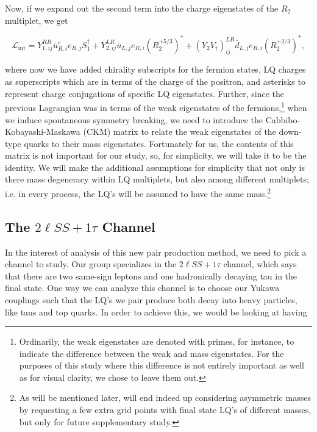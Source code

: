         Now, if we expand out the second term into the charge eigenstates of the $R_2$ multiplet, we get

        \begin{equation}
            \mathcal{L}_{\text{int}} = Y_{1,ij}^{RR} \bar{u}^c_{R,i} e_{R,j} S_1^{\dagger} + Y_{2,ij}^{LR} \bar{u}_{L,j} e_{R,i}  (R_2^{+5/3})^* + (Y_2 V_{\dagger})_{ij}^{LR}\bar{d}_{L,j} e_{R,i}  (R_2^{+2/3})^*,
        \end{equation}

        where now we have added chirality subscripts for the fermion states, LQ charges as superscripts which are in terms of the charge of the positron, and asterisks to represent charge conjugations of specific LQ eigenstates. Further, since the previous Lagrangian was in terms of the weak eigenstates of the fermions,\footnote{Ordinarily, the weak eigenstates are denoted with primes, for instance, to indicate the difference between the weak and mass eigenstates. For the purposes of this study where this difference is not entirely important as well as for visual clarity, we chose to leave them out.} when we induce spontaneous symmetry breaking, we need to introduce the Cabbibo-Kobayashi-Maskawa (CKM) matrix to relate the weak eigenstates of the down-type quarks to their mass eigenstates. Fortunately for us, the contents of this matrix is not important for our study, so, for simplicity, we will take it to be the identity. We will make the additional assumptions for simplicity that not only is there mass degeneracy within LQ multiplets, but also among different multiplets; i.e. in every process, the LQ's will be assumed to have the same mass.\footnote{As will be mentioned later, will end indeed up considering asymmetric masses by requesting a few extra grid points with final state LQ's of different masses, but only for future supplementary study.}



    \subsection{The \texorpdfstring{$2\ell SS+1\tau$}{2lSS+1tau} Channel}
        In the interest of analysis of this new pair production method, we need to pick a channel to study. Our group specializes in the $2\ell SS+1\tau$ channel, which says that there are two same-sign leptons and one hadronically decaying tau in the final state. One way we can analyze this channel is to choose our Yukawa couplings such that the LQ's we pair produce both decay into heavy particles, like taus and top quarks. In order to achieve this, we would be looking at having
        
